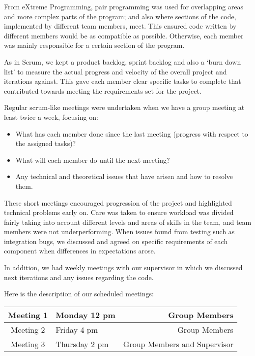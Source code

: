 From eXtreme Programming, pair programming was used for overlapping areas and more complex parts of the program; and also where sections of the code, implemented by different team members, meet. This ensured code written by different members would be as compatible as possible. Otherwise, each member was mainly responsible for a certain section of the program.

As in Scrum, we kept a product backlog, sprint backlog and also a `burn down list' to measure the actual progress and velocity of the overall project and iterations against. This gave each member clear specific tasks to complete that contributed towards meeting the requirements set for the project.

Regular scrum-like meetings were undertaken when we have a group meeting at least twice a week, focusing on:

\begin{itemize}
\item What has each member done since the last meeting (progress with respect to the assigned tasks)?
\item What will each member do until the next meeting?
\item Any technical and theoretical issues that have arisen and how to resolve them.
\end{itemize}

These short meetings encouraged progression of the project and highlighted technical problems early on. Care was taken to ensure workload was divided fairly taking into account different levels and areas of skills in the team, and team members were not underperforming. When issues found from testing such as integration bugs, we discussed and agreed on specific requirements of each component when differences in expectations arose.

In addition, we had weekly meetings with our supervisor in which we discussed next iterations and any issues regarding the code.

Here is the description of our scheduled meetings:
\begin{center}
\begin{tabular}{| c | l | r |}
\hline
Meeting 1 & Monday 12 pm & Group Members \\ \hline
Meeting 2 & Friday 4 pm & Group Members \\ \hline
Meeting 3 & Thursday 2 pm & Group Members and Supervisor \\ 
\hline
\end{tabular}
\end{center}

